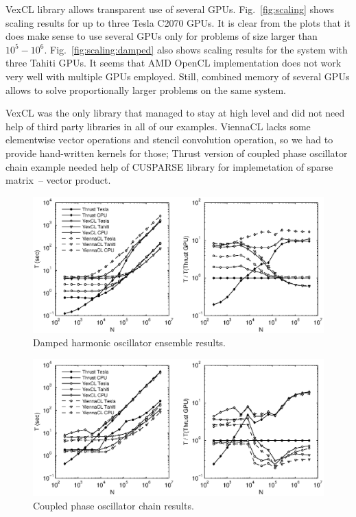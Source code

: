\documentclass[1p]{elsarticle}
\newcommand{\figref}[1]{Fig.~\ref{#1}}
\begin{document}
VexCL library allows transparent use of several GPUs. \figref{fig:scaling}
shows scaling results for up to three Tesla C2070 GPUs. It is clear from the
plots that it does make sense to use several GPUs only for problems of size
larger than $10^5-10^6$. \figref{fig:scaling:damped} also shows
scaling results for the system with three Tahiti GPUs. It seems that AMD OpenCL
implementation does not work very well with multiple GPUs employed. Still,
combined memory of several GPUs allows to solve proportionally larger problems
on the same system.

VexCL was the only library that managed to stay at high level and did not need
help of third party libraries in all of our examples. ViennaCL lacks some
elementwise vector operations and stencil convolution operation, so we had to
provide hand-written kernels for those; Thrust version of coupled phase
oscillator chain example needed help of CUSPARSE library for implemetation of
sparse matrix~-- vector product.

\begin{figure}[p]
    \begin{center}
        \includegraphics[width=\textwidth]{data/damped_oscillator/perfcmp}
    \end{center}
    \caption{Damped harmonic oscillator ensemble results.}
    \label{fig:damped:perf}
\end{figure}

\begin{figure}[p]
    \begin{center}
        \includegraphics[width=\textwidth]{data/phase_oscillator_chain/perfcmp}
    \end{center}
    \caption{Coupled phase oscillator chain results.}
    \label{fig:phase:perf}
\end{figure}
\end{document}
